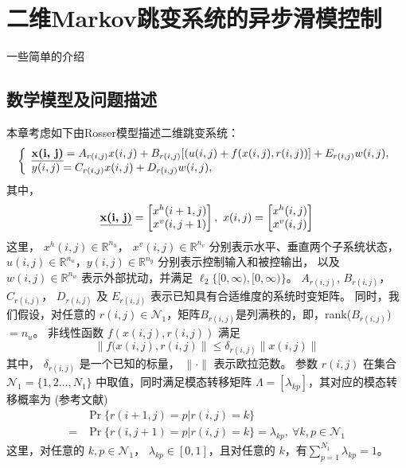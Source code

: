 
\chapter{二维Markov跳变系统的异步滑模控制}
一些简单的介绍

\section{数学模型及问题描述}
	本章考虑如下由Rosser模型描述二维跳变系统：
	\begin{equation} \label{system-equation}
	\left\{
	\begin{array}{lr}
	\begin{split}
	\emph{\textbf{x(i, j)}} = A_{r(i,j)}x(i,j)+B_{r(i,j)}[(u(i,j)+f(x(i,j),r(i,j))]+E_{r(i,j)}w(i,j),
	\end{split}\\
	\begin{split}
	y(i,j) = C_{r(i,j)}x(i,j)+D_{r(i,j)}w(i,j),
	\end{split}
	\end{array}
	\right.
	\end{equation}
	其中，
	\begin{equation*}
	\emph{\textbf{x(i, j)}} = \begin{bmatrix}
	x^{h}(i+1,j)\\
	x^{v}(i,j+1)
	\end{bmatrix}, \ 
	x(i, j) = \begin{bmatrix}
	x^{h}(i,j)\\
	x^{v}(i,j)
	\end{bmatrix}          
	\end{equation*}
	这里，	$x^{h}(i,j)\in \mathbb{R}^{n_h}$， $x^{v}(i,j)\in \mathbb{R}^{n_v}$ 分别表示水平、垂直两个子系统状态， $u(i,j) \in \mathbb{R}^{n_u}$，$y(i,j) \in \mathbb{R}^{n_y}$ 分别表示控制输入和被控输出， 以及 $w(i,j) \in \mathbb{R}^{n_w}$ 表示外部扰动，并满足 $\ell_{2}\{[0,\infty),[0,\infty)\}$。 $A_{r(i,j)}$, $B_{r(i,j)}$， $C_{r(i,j)}$， $D_{r(i,j)}$ 及 $E_{r(i,j)}$ 表示已知具有合适维度的系统时变矩阵。 同时，我们假设，对任意的 $r(i,j)\in\mathcal{N}_{1}$，矩阵$B_{r(i,j)}$是列满秩的，即，rank($B_{r(i,j)}$)$=n_u$。 非线性函数 $f(x(i,j),r(i,j))$ 满足
	\begin{equation}\label{nonlinear-func}
	\|f(x(i,j),r(i,j)\| \leq \delta_{r(i,j)}\|x(i,j)\|
	\end{equation}
	其中， $\delta_{r(i,j)}$ 是一个已知的标量， $\|\cdot\|$ 表示欧拉范数。 参数 $r(i,j)$ 在集合 $\mathcal{N}_{1}=\{1,2...,N_{1} \}$ 中取值，同时满足模态转移矩阵 $\varLambda = [\lambda_{kp}]$，其对应的模态转移概率为  (参考文献\cite{wu2018hcontrol2d,wu2008hfiltering2d})
	\begin{equation}\label{tps_system}
	\begin{split}
	&\Pr\{r(i+1,j)=p|r(i,j)=k\}\\
	=&\Pr\{r(i,j+1)=p|r(i,j)=k\}=\lambda_{kp},\  \forall k,p \in \mathcal{N}_{1}
	\end{split}
	\end{equation}	
	这里，对任意的  $k, p\in\mathcal{N}_{1}$， $\lambda_{kp}\in[0,1]$，且对任意的 $k$，有$\sum_{p=1}^{N_1}\lambda_{kp}=1$。
	
